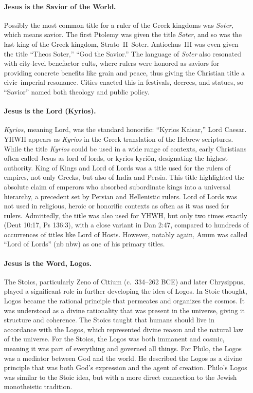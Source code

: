 \paragraph{Jesus is the Savior of the World.}\label{par:jesus-is-the-savior-of-the-world.}
Possibly the most common title for a ruler of the Greek kingdoms was \emph{Soter}, which means savior.
The first Ptolemy was given the title \emph{Soter}, and so was the last king of the Greek kingdom, Strato~II~Soter.
Antiochus~III was even given the title “Theos Soter,” “God the Savior.”
The language of \emph{Soter} also resonated with city-level benefactor cults, where rulers were honored as saviors for providing concrete benefits like grain and peace, thus giving the Christian title a civic–imperial resonance.
Cities enacted this in festivals, decrees, and statues, so “Savior” named both theology and public policy.

\paragraph{Jesus is the Lord (Kyrios).}\label{par:jesus-is-the-lord-kyrios}
\emph{Kyrios}, meaning Lord, was the standard honorific: “Kyrios Kaisar,” Lord Caesar.
YHWH appears as \emph{Kyrios} in the Greek translation of the Hebrew scriptures.
While the title \emph{Kyrios} could be used in a wide range of contexts, early Christians often called Jesus as lord of lords, or kyrios kyriōn, designating the highest authority.
King of Kings and Lord of Lords was a title used for the rulers of empires, not only Greeks, but also of India and Persia.
This title highlighted the absolute claim of emperors who absorbed subordinate kings into a universal hierarchy, a precedent set by Persian and Hellenistic rulers.
Lord of Lords was not used in religious, heroic or honorific contexts as often as it was used for rulers.
Admittedly, the title was also used for YHWH, but only two times exactly (Deut 10:17, Ps 136:3), with a close variant in Dan 2:47, compared to hundreds of occurrences of titles like Lord of Hosts.
However, notably again, Amun was called “Lord of Lords” (nb nbw) as one of his primary titles.

\paragraph{Jesus is the Word, Logos.}\label{par:jesus-is-the-word.}
The Stoics, particularly Zeno of Citium (c.~334–262 BCE) and later Chrysippus, played a significant role in further developing the idea of Logos.
In Stoic thought, Logos became the rational principle that permeates and organizes the cosmos.
It was understood as a divine rationality that was present in the universe, giving it structure and coherence.
The Stoics taught that humans should live in accordance with the Logos, which represented divine reason and the natural law of the universe.
For the Stoics, the Logos was both immanent and cosmic, meaning it was part of everything and governed all things.
For Philo, the Logos was a mediator between God and the world.
He described the Logos as a divine principle that was both God’s expression and the agent of creation.
Philo’s Logos was similar to the Stoic idea, but with a more direct connection to the Jewish monotheistic tradition.

